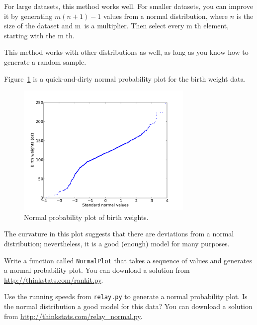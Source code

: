 \documentclass[12pt]{book}
\begin{document}
For large datasets, this method works well.
For smaller datasets, you can improve it by generating $m (n+1) - 1$
values from a normal distribution, where $n$ is the size of the
dataset and m~is a multiplier.  Then select every m th element,
starting with the m th.  


This method works with other distributions as well, as long as
you know how to generate a random sample.

Figure~\ref{nsfg_birthwgt_normal} is a quick-and-dirty normal
probability plot for the birth weight data.

\begin{figure}
\centerline{\includegraphics[height=2.5in]{figs/nsfg_birthwgt_normal.pdf}}
\caption{Normal probability plot of birth weights.}
\label{nsfg_birthwgt_normal}
\end{figure}

The curvature in this plot suggests that there are
deviations from a normal distribution; nevertheless, it is a
good (enough) model for many purposes.

\begin{exercise}
Write a function called {\tt NormalPlot} that takes a sequence of
values and generates a normal probability plot.  You can download
a solution from \url{http://thinkstats.com/rankit.py}.

Use the running speeds from {\tt relay.py} to generate a normal
probability plot.  Is the normal distribution a good model for this
data?  You can download a solution from
\url{http://thinkstats.com/relay_normal.py}.

\end{exercise}
\end{document}
